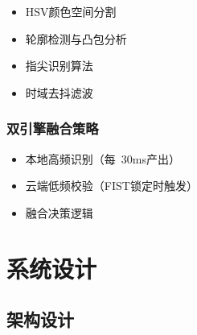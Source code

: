 \documentclass{article}
\begin{document}
\begin{itemize}[leftmargin=*]
    \item HSV颜色空间分割
    \item 轮廓检测与凸包分析
    \item 指尖识别算法
    \item 时域去抖滤波
\end{itemize}

\subsubsection{双引擎融合策略}

\begin{itemize}[leftmargin=*]
    \item 本地高频识别（每~30ms产出）
    \item 云端低频校验（FIST锁定时触发）
    \item 融合决策逻辑
\end{itemize}

\newpage

\section{系统设计}

\subsection{架构设计}
\end{document}

